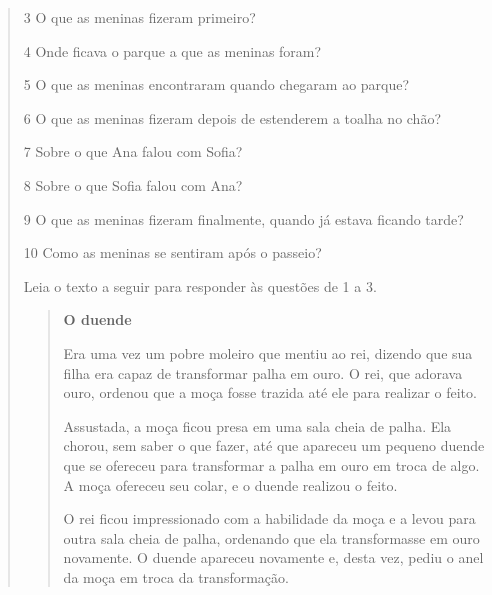 \begin{quote}
\num{3} O que as meninas fizeram primeiro?



\num{4} Onde ficava o parque a que as meninas foram?



\num{5} O que as meninas encontraram quando chegaram ao parque?



\num{6} O que as meninas fizeram depois de estenderem a toalha no chão?



\num{7} Sobre o que Ana falou com Sofia?



\num{8} Sobre o que Sofia falou com Ana?



\num{9} O que as meninas fizeram finalmente, quando já estava ficando tarde?



\num{10} Como as meninas se sentiram após o passeio?




Leia o texto a seguir para responder às questões de 1 a 3.

\begin{quote}
\textbf{O duende}

Era uma vez um pobre moleiro que mentiu ao rei, dizendo que sua filha
era capaz de transformar palha em ouro. O rei, que adorava ouro, ordenou
que a moça fosse trazida até ele para realizar o feito.

Assustada, a moça ficou presa em uma sala cheia de palha. Ela chorou,
sem saber o que fazer, até que apareceu um pequeno duende que se
ofereceu para transformar a palha em ouro em troca de algo. A moça
ofereceu seu colar, e o duende realizou o feito.

O rei ficou impressionado com a habilidade da moça e a levou para outra
sala cheia de palha, ordenando que ela transformasse em ouro novamente.
O duende apareceu novamente e, desta vez, pediu o anel da moça em troca
da transformação.


\end{quote}
\end{quote}

